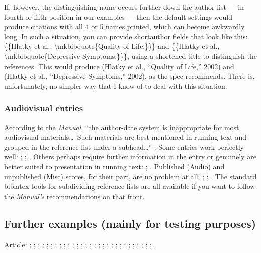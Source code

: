 \documentclass[a4paper,12pt]{report}
\begin{document}
If, however, the distinguishing name occurs further down the author
list --- in fourth or fifth position in our examples --- then the
default settings would produce citations with all 4 or 5 names
printed, which can become awkwardly long.  In such a situation, you
can provide \textsf{shortauthor} fields that look like this:
\{\{Hlatky et al., \textbackslash mkbibquote\{Quality of Life,\}\}\}
and \{\{Hlatky et al., \textbackslash mkbibquote\{Depressive
Symptoms,\}\}\}, using a shortened title to distinguish the
references.  This would produce (Hlatky et al., \enquote{Quality of
  Life,} 2002) and (Hlatky et al., \enquote{Depressive Symptoms,}
2002), as the spec recommends.  There is, unfortunately, no simpler
way that I know of to deal with this situation.

\subsubsection*{Audiovisual entries}
\label{sec:audiovisual}

According to the \emph{Manual}, \enquote{the author-date system is
  inappropriate for most audiovisual materials\ldots\ Such materials
  are best mentioned in running text and grouped in the reference list
  under a subhead\ldots} \autocite[17.265]{chicago:manual:15}.  Some
entries work perfectly well: \autocite{auden:reading:15};
\autocite{hitchcock:nbynw}; \autocite{handel:messiah:15}.  Others
perhaps require further information in the entry or genuinely are
better suited to presentation in running text:
\autocite{beethoven:sonata29}; \autocite{nytrumpet:art:15}.  Published
(\textsf{Audio}) and unpublished (\textsf{Misc}) scores, for their
part, are no problem at all: \autocite{schubert:muellerin};
\autocite{verdi:corsaro}; \autocite{shapey:partita:15}.  The standard
\textsf{biblatex} tools for subdividing reference lists are all
available if you want to follow the \emph{Manual's} recommendations on
that front.

\subsection*{Further examples (mainly for testing purposes)}
\label{testing}

Article: \autocite{assocpress:gun}; \autocite{brown:bremer};
\autocite{bundy:macneil}; \autocite{chu:panda};
\autocite{Clemens:letter}; \autocite{conley:fifthgrade};
\autocite{connell:chronic}; \autocite{friedman:learning};
\autocite{garaud:gatine}; \autocite{garrett:15};
\autocite{gibbard:15}; \autocite{kern}; \autocite{kimluu:diethyl:15};
\autocite{kozinn:review}; \autocite{lewis:15};
\autocite{loften:hamlet}; \autocite{loomis:structure:15};
\autocite{morgenson:market}; \autocite{osborne:poison:15};
\autocite{ratliff:review:15}; \autocite{reaves:rosen};
\autocite{rozner:liberation}; \autocite{schneider:mittelpleistozaene};
\autocite{sewall:letter}; \autocite{stenger:privacy};
\autocite{terborgh:preservation}; \autocite{wall:radio};
\autocite{wallraff:word}; \autocite{warr:ellison};
\autocite{white:callimachus}.
\end{document}
